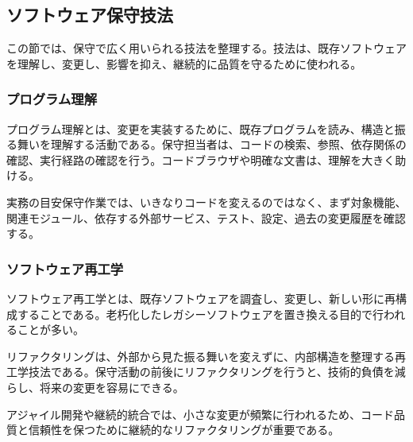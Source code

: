 \subsection{ソフトウェア保守技法}
この節では、保守で広く用いられる技法を整理する。技法は、既存ソフトウェアを理解し、変更し、影響を抑え、継続的に品質を守るために使われる。\par
\subsubsection{プログラム理解}
プログラム理解とは、変更を実装するために、既存プログラムを読み、構造と振る舞いを理解する活動である。保守担当者は、コードの検索、参照、依存関係の確認、実行経路の確認を行う。コードブラウザや明確な文書は、理解を大きく助ける。\par
\begin{pointbox}{実務の目安}保守作業では、いきなりコードを変えるのではなく、まず対象機能、関連モジュール、依存する外部サービス、テスト、設定、過去の変更履歴を確認する。\end{pointbox}
\subsubsection{ソフトウェア再工学}
ソフトウェア再工学とは、既存ソフトウェアを調査し、変更し、新しい形に再構成することである。老朽化したレガシーソフトウェアを置き換える目的で行われることが多い。\par
リファクタリングは、外部から見た振る舞いを変えずに、内部構造を整理する再工学技法である。保守活動の前後にリファクタリングを行うと、技術的負債を減らし、将来の変更を容易にできる。\par
アジャイル開発や継続的統合では、小さな変更が頻繁に行われるため、コード品質と信頼性を保つために継続的なリファクタリングが重要である。\par
